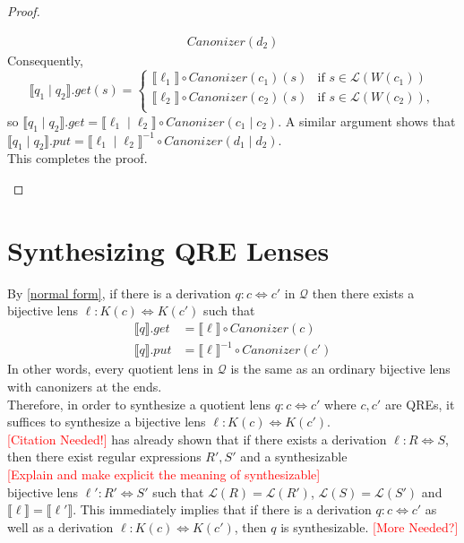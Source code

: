 \documentclass{svproc}
\newcommand{\sep}{\ensuremath{\; | \;}}
\begin{document}
\begin{proof}
\begin{enumerate}
\begin{align*}
Canonizer(d_2)
\end{align*}
Consequently,
$$
  \llbracket q_1 \sep q_2 \rrbracket.get(s) = 
  \begin{cases}
  \llbracket \ell_1 \rrbracket \circ
Canonizer(c_1) (s) & \text{if } s \in \mathcal{L}(W(c_1))\\
  \llbracket \ell_2 \rrbracket \circ
Canonizer(c_2) (s) & \text{if } s \in \mathcal{L}(W(c_2)),\\
  \end{cases}$$
  so $\llbracket q_1 \sep q_2 \rrbracket.get = \llbracket \ell_1 \sep
  \ell_2 \rrbracket \circ Canonizer(c_1 \sep c_2)$. A similar argument shows
  that $\llbracket q_1 \sep q_2 \rrbracket.put = \llbracket \ell_1 \sep
  \ell_2 \rrbracket^{-1} \circ Canonizer(d_1 \sep d_2)$.\\
  This completes the proof.
\end{enumerate}
\end{proof}

\section{Synthesizing QRE Lenses}
\label{synth}

By \cref{normal form}, if there is a derivation $q : c \Leftrightarrow c'$ in
$\mathcal{Q}$ then there exists a bijective lens $\ell : K(c) \Leftrightarrow
K(c')$ such that
\begin{align*}
\llbracket q \rrbracket.get &= \llbracket \ell \rrbracket\circ Canonizer(c)\\
\llbracket q \rrbracket.put &= \llbracket \ell \rrbracket^{-1} \circ
Canonizer(c')
\end{align*}
In other words, every quotient lens in $\mathcal{Q}$ is the same as an ordinary
bijective lens with canonizers at the ends.\\
Therefore, in order to synthesize a quotient lens $q: c \Leftrightarrow c'$
where $c, c'$ are QREs, it suffices to synthesize a bijective lens $\ell : K(c)
\Leftrightarrow K(c')$.\\
\textcolor{red}{[Citation Needed!]} has already shown that if there
exists a derivation $\ell : R \Leftrightarrow S$, then there exist
regular expressions $R', S'$ and a synthesizable \\
\textcolor{red}{[Explain and make explicit the meaning
of synthesizable]} \\
bijective lens $\ell' :
R' \Leftrightarrow S'$ such that $\mathcal{L}(R) = \mathcal{L}(R')$,
$\mathcal{L}(S) = \mathcal{L}(S')$ and $\llbracket \ell \rrbracket =
\llbracket \ell' \rrbracket$. This immediately implies that if there is a
derivation $q : c \Leftrightarrow c'$ as well as a derivation $\ell : K(c)
\Leftrightarrow K(c')$, then $q$ is synthesizable.
\textcolor{red}{[More Needed?]}
\end{document}
